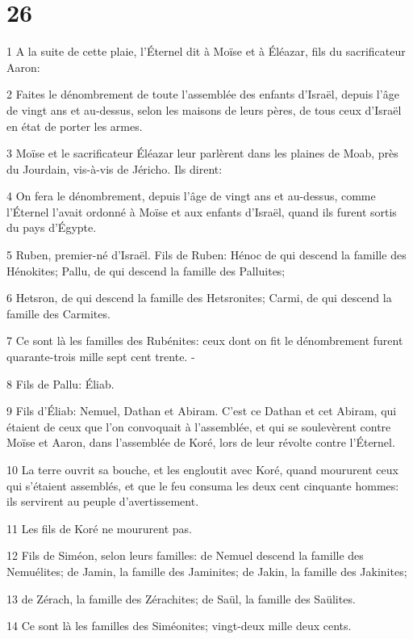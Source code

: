 \chapter{26}

\par 1 A la suite de cette plaie, l'Éternel dit à Moïse et à Éléazar, fils du sacrificateur Aaron:
\par 2 Faites le dénombrement de toute l'assemblée des enfants d'Israël, depuis l'âge de vingt ans et au-dessus, selon les maisons de leurs pères, de tous ceux d'Israël en état de porter les armes.
\par 3 Moïse et le sacrificateur Éléazar leur parlèrent dans les plaines de Moab, près du Jourdain, vis-à-vis de Jéricho. Ils dirent:
\par 4 On fera le dénombrement, depuis l'âge de vingt ans et au-dessus, comme l'Éternel l'avait ordonné à Moïse et aux enfants d'Israël, quand ils furent sortis du pays d'Égypte.
\par 5 Ruben, premier-né d'Israël. Fils de Ruben: Hénoc de qui descend la famille des Hénokites; Pallu, de qui descend la famille des Palluites;
\par 6 Hetsron, de qui descend la famille des Hetsronites; Carmi, de qui descend la famille des Carmites.
\par 7 Ce sont là les familles des Rubénites: ceux dont on fit le dénombrement furent quarante-trois mille sept cent trente. -
\par 8 Fils de Pallu: Éliab.
\par 9 Fils d'Éliab: Nemuel, Dathan et Abiram. C'est ce Dathan et cet Abiram, qui étaient de ceux que l'on convoquait à l'assemblée, et qui se soulevèrent contre Moïse et Aaron, dans l'assemblée de Koré, lors de leur révolte contre l'Éternel.
\par 10 La terre ouvrit sa bouche, et les engloutit avec Koré, quand moururent ceux qui s'étaient assemblés, et que le feu consuma les deux cent cinquante hommes: ils servirent au peuple d'avertissement.
\par 11 Les fils de Koré ne moururent pas.
\par 12 Fils de Siméon, selon leurs familles: de Nemuel descend la famille des Nemuélites; de Jamin, la famille des Jaminites; de Jakin, la famille des Jakinites;
\par 13 de Zérach, la famille des Zérachites; de Saül, la famille des Saülites.
\par 14 Ce sont là les familles des Siméonites; vingt-deux mille deux cents.

